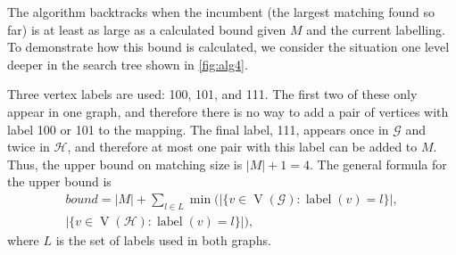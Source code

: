 \documentclass[letterpaper]{article}
\newcommand{\graphG}{\mathcal{G}}
\newcommand{\graphH}{\mathcal{H}}
\DeclareMathOperator{\V}{V}
\DeclareMathOperator{\vtxlabel}{label}
\begin{document}
The algorithm backtracks when the incumbent (the largest matching found so far) is at least as large
as a calculated bound given $M$ and the current labelling. To demonstrate how
this bound is calculated, we consider the situation one level deeper in the
search tree shown in \cref{fig:alg4}.

Three vertex labels are used: 100,
101, and 111.  The first two of these only appear in one graph, and therefore
there is no way to add a pair of vertices with label 100 or 101 to the mapping.
The final label, 111, appears once in $\graphG$ and twice in $\graphH$, and therefore at
most one pair with this label can be added to $M$.  Thus, the upper bound on
matching size is $|M| + 1 = 4$. The general formula for the upper bound is
\begin{multline*}
    \mathit{bound} = |M| + \sum_{l \in L} \min\big(|\{ v \in \V(\graphG) : \vtxlabel(v)=l\}|, \\[-0.3cm]
        |\{ v \in \V(\graphH) : \vtxlabel(v)=l \}|\big) \text{,}
\end{multline*} where $L$ is the set of labels used in both graphs.

\end{document}
